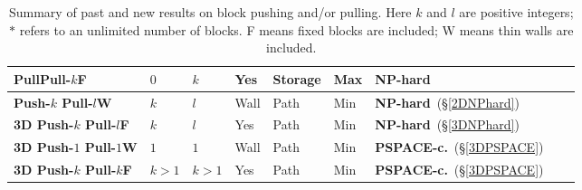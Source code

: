 \begin{table}
{\begin{tabular}{|l|l|l|l|l|l|l|l|l|}
PullPull-$k$F & $0$ & $k$ & Yes & Storage  & Max  & NP-hard\cite{Pull10} \\ \hline
\textbf{Push-$k$ Pull-$l$W} & $k$ & $l$ & Wall & Path  & Min & \textbf{NP-hard}\ (\S  \ref{2DNPhard}) \\ \hline
\textbf{3D Push-$k$ Pull-$l$F} & $k$ & $l$ & Yes & Path & Min &  \textbf{NP-hard}\ (\S  \ref{3DNPhard}) \\ \hline
\textbf{3D Push-$1$ Pull-$1$W} & $1$ & $1$ & Wall & Path & Min &  \textbf{PSPACE-c.}\ (\S  \ref{3DPSPACE}) \\ \hline
\textbf{3D Push-$k$ Pull-$k$F} & $k > 1$ & $k >1$ & Yes & Path & Min &  \textbf{PSPACE-c.}\ (\S  \ref{3DPSPACE}) \\ \hline
\end{tabular}
}
\caption{Summary of past and new results on block pushing and/or pulling. Here $k$ and $l$ are positive integers; $*$ refers to an unlimited number of blocks. F means fixed blocks are included; W means thin walls are included.} %
\label{BlocksTable}
\end{table}



